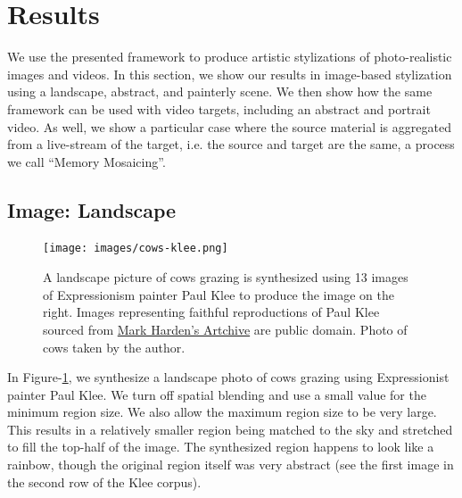 \documentclass[a4paper,11pt,final]{ThesisStyle}
\begin{document}
\section{Results}  
\label{sec:results}
We use the presented framework to produce artistic stylizations of photo-realistic images and videos.  In this section, we show our results in image-based stylization using a landscape, abstract, and painterly scene. We then show how the same framework can be used with video targets, including an abstract and portrait video.  As well, we show a particular case where the source material is aggregated from a live-stream of the target, i.e. the source and target are the same, a process we call ``Memory Mosaicing''.  

\subsection{Image: Landscape}\vspace{-0.4em}
\begin{figure}[ht]
  \centering
  \texttt{[image: images/cows-klee.png]}
  \caption{A landscape picture of cows grazing is synthesized using 13 images of Expressionism painter Paul Klee to produce the image on the right.  Images representing faithful reproductions of Paul Klee sourced from \href{http://www.artchive.com/}{Mark Harden's Artchive} are public domain. Photo of cows taken by the author.}
  \label{fig:cows-klee}
\end{figure}
In Figure-\ref{fig:cows-klee}, we synthesize a landscape photo of cows grazing using Expressionist painter Paul Klee.  We turn off spatial blending and use a small value for the minimum region size.  We also allow the maximum region size to be very large.  This results in a relatively smaller region being matched to the sky and stretched to fill the top-half of the image.  The synthesized region happens to look like a rainbow, though the original region itself was very abstract (see the first image in the second row of the Klee corpus).  
\end{document}
